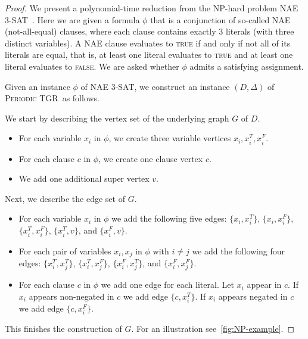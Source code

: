 \documentclass[a4paper,UKenglish,cleveref, autoref, thm-restate]{lipics-v2021}
\newcommand{\deltaExact}{\textsc{Periodic TGR}}
\begin{document}
\begin{proof}
	We present a polynomial-time reduction from the NP-hard problem NAE 3-SAT~\cite{Schaefer1978complexity}. Here we are given a formula $\phi$ that is a conjunction of so-called NAE (not-all-equal) clauses, where each clause contains exactly 3 literals (with three distinct variables).
    A NAE clause evaluates to \textsc{true} if and only if not all of its literals are equal, that is, at least one literal evaluates to \textsc{true} and at least one literal evaluates to \textsc{false}.
    We are asked whether $\phi$ admits a satisfying assignment. 

    
    Given an instance $\phi$ of NAE 3-SAT, we construct an instance $(D,\Delta)$ of \deltaExact\ as follows.

 We start by describing the vertex set of the underlying graph $G$ of $D$.
\begin{itemize}
\item For each variable $x_i$ in $\phi$, we create three variable vertices $x_i, x_i^T, x_i^F$.
\item For each clause $c$ in $\phi$, we create one clause vertex $c$.
\item We add one additional super vertex $v$.
\end{itemize}
Next, we describe the edge set of $G$.
\begin{itemize}
\item For each variable $x_i$ in $\phi$ we add the following five edges: 
$\{x_i, x_i^T\}$, $\{x_i, x_i^F\}$, $\{x_i^T, x_i^F\}$, $\{x_i^T, v\}$, and $\{x_i^F,v\}$.
\item For each pair of variables $x_i,x_j$ in $\phi$ with $i \neq j$ we add the following four edges: 
$\{x_i^T, x_j^T\}$, $\{x_i^T,x_j^F\}$, $\{x_i^F,x_j^T\}$, and $\{x_i^F,x_j^F\}$.
\item For each clause $c$ in $\phi$ we add one edge for each literal. Let $x_i$ appear in $c$. If $x_i$ appears non-negated in $c$ we add edge $\{c, x_i^T\}$. 
If $x_i$ appears negated in $c$ we add edge $\{c, x_i^F\}$.
\end{itemize}
This finishes the construction of $G$.
For an illustration see~\cref{fig:NP-example}.


\end{proof}
\end{document}
